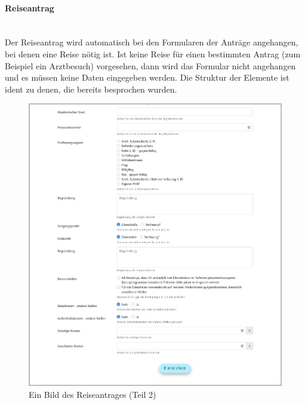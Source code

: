 \paragraph{Reiseantrag}
~\\
Der Reiseantrag wird automatisch bei den Formularen der Anträge angehangen, bei denen eine Reise nötig ist. Ist keine Reise für einen bestimmten Antrag (zum Beispiel ein Arztbesuch) vorgesehen, dann wird das Formular nicht angehangen und es müssen keine  Daten eingegeben werden. Die Struktur der Elemente ist ident zu denen, die bereits besprochen wurden.
\begin{figure}[H]
	\centering
	\includegraphics[width=1\linewidth]{images/website/zusatz_1}
	\caption[Neuer Schulantrag]{Ein Bild des Reiseantrages (Teil 2)}
	\label{fig:zusatz1}
\end{figure}

